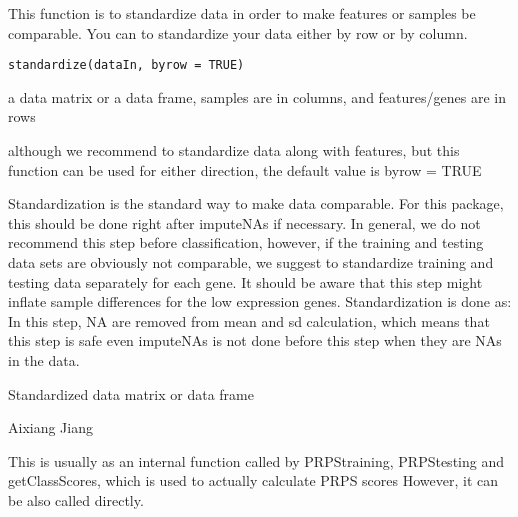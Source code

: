 \documentclass[letterpaper]{book}
\begin{document}
%
\begin{Description}\relax
This function is to standardize data in order to make features or samples be comparable. 
You can to standardize your data either by row or by column.
\end{Description}
%
\begin{Usage}
\begin{verbatim}
standardize(dataIn, byrow = TRUE)
\end{verbatim}
\end{Usage}
%
\begin{Arguments}
\begin{ldescription}
\item[\code{dataIn}] a data matrix or a data frame, samples are in columns, and features/genes are in rows

\item[\code{byrow}] although we recommend to standardize data along with features, 
but this function can be used for either direction, the default value is byrow = TRUE
\end{ldescription}
\end{Arguments}
%
\begin{Details}\relax
Standardization is the standard way to make data comparable. For this package, 
this should be done right after imputeNAs if necessary. In general, 
we do not recommend this step before classification, however, if the training and testing data sets
are obviously not comparable, we suggest to standardize training and testing data separately for each gene. 
It should be aware that this step might inflate sample differences for the low expression genes.
Standardization is done as:
In this step, NA are removed from mean and sd calculation, which means that this step is safe even imputeNAs is not done before this step when they are NAs in the data.
\end{Details}
%
\begin{Value}
Standardized data matrix or data frame
\end{Value}
%
\begin{Author}\relax
Aixiang Jiang
\end{Author}
%
\begin{Description}\relax
This is usually as an internal function called by PRPStraining, PRPStesting and getClassScores, which is used to actually
calculate PRPS scores However, it can be also called directly.
\end{Description}
\end{document}
